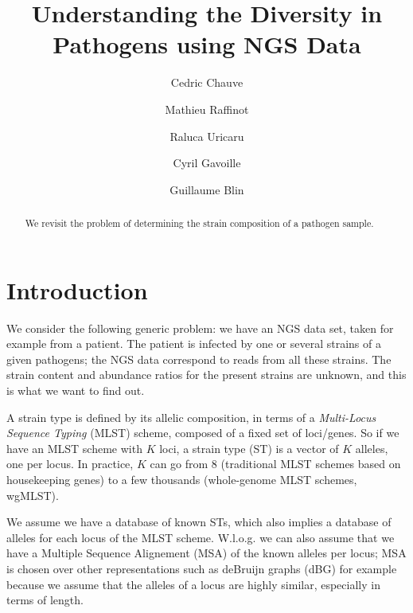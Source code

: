 \documentclass[10pt]{llncs}
\begin{document}

\title{Understanding the Diversity in Pathogens using NGS Data}

\author{Cedric Chauve \and Mathieu Raffinot \and Raluca Uricaru \and Cyril Gavoille \and Guillaume Blin}


\maketitle

\begin{abstract}
We revisit the problem of determining the strain composition of a pathogen sample.
\end{abstract}

\section{Introduction}
\label{sec:intro}

We consider the following generic problem: we have an NGS data set, taken for example from a patient. The patient is infected by one or several strains of a given pathogens; the NGS data correspond to reads from all these strains. The strain content and abundance ratios for the present strains are unknown, and this is what we want to find out.

A strain type is defined by its allelic composition, in terms of a \textit{Multi-Locus Sequence Typing} (MLST) scheme, composed of a fixed set of loci/genes. So if we have an MLST scheme with $K$ loci, a strain type (ST) is a vector of $K$ alleles, one per locus. In practice, $K$ can go from $8$ (traditional MLST schemes based on housekeeping genes) to a few thousands (whole-genome MLST schemes, wgMLST).

We assume we have a database of known STs, which also implies a database of alleles for each locus of the MLST scheme. W.l.o.g. we can also assume that we have a Multiple Sequence Alignement (MSA) of the known alleles per locus; MSA is chosen over other representations such as deBruijn graphs (dBG) for example because we assume that the alleles of a locus are highly similar, especially in terms of length. 
\end{document}
